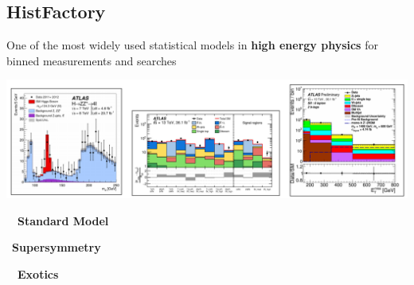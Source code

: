 \documentclass[princeton,portrait]{a0poster}
\begin{document}
\begin{multicols}{2} %





 \section*{\LARGE\color{MediumBlue} HistFactory}
 \large
 One of the most widely used statistical models in \textbf{high energy physics} for binned measurements and searches

 \begin{center}
  \includegraphics[width=\linewidth]{HistFactory_result_examples.png}
 \end{center}
 \begin{minipage}{0.33\linewidth}
  \begin{flushleft}
   \large\quad~~\textbf{Standard Model}
  \end{flushleft}
 \end{minipage}%
 \quad
 \begin{minipage}{0.33\linewidth}
  \begin{flushleft}
   \large\quad~\textbf{Supersymmetry}
  \end{flushleft}
 \end{minipage}%
 \quad
 \begin{minipage}{0.33\linewidth}
  \begin{flushleft}
   \large\qquad~~\textbf{Exotics}
  \end{flushleft}
 \end{minipage}%


\end{multicols}
\end{document}
